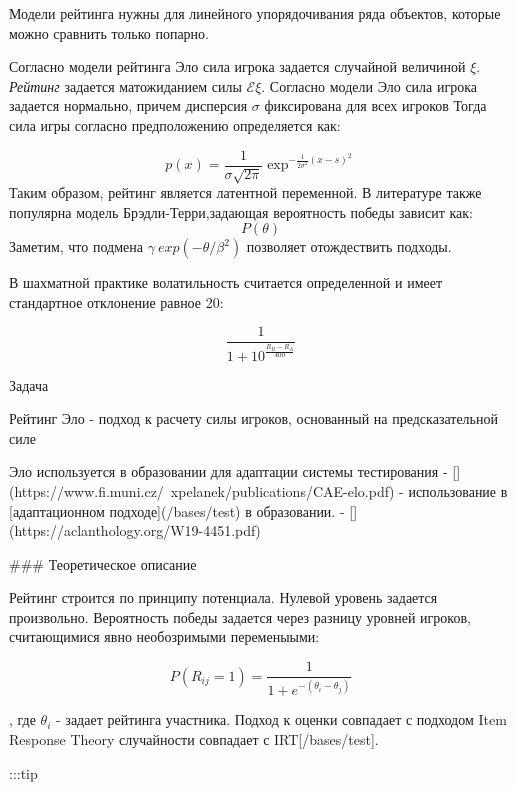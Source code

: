 Модели рейтинга нужны для линейного упорядочивания ряда объектов, которые можно сравнить только попарно.

Согласно модели рейтинга Эло сила игрока задается случайной величиной $\xi$. \textit{Рейтинг} задается матожиданием силы $\mathcal{E} \xi$.
Согласно модели Эло сила игрока задается нормально, причем дисперсия $\sigma$ фиксирована для всех игроков
Тогда сила игры согласно предположению определяется как:

\begin{equation}
    p(x) = \frac{1}{\sigma \sqrt{2\pi}} \exp^{- \frac{1}{2\sigma^2}{(x-s)^2}}
\end{equation}
Таким образом, рейтинг является латентной переменной. В литературе также популярна модель Брэдли-Терри,задающая
вероятность победы зависит как:
\begin{equation}
    P(\theta)
\end{equation}
Заметим, что подмена $\gamma ~ exp(-\theta/\beta^2)$ позволяет отождествить подходы.



В шахматной практике волатильность считается определенной и имеет стандартное отклонение равное 20:

$$
    \frac{1}{1+10^\frac{R_B-R_A}{400}}
$$

Задача

\textit{}

Рейтинг Эло - подход к расчету силы игроков, основанный на предсказательной силе

Эло используется в образовании для адаптации системы тестирования \cite{}
- [](https://www.fi.muni.cz/~xpelanek/publications/CAE-elo.pdf) - использование в [адаптационном подходе](/bases/test) в образовании. 
- [](https://aclanthology.org/W19-4451.pdf)


### Теоретическое описание

Рейтинг строится по принципу потенциала. Нулевой уровень задается произвольно. Вероятность победы задается через разницу уровней игроков, считающимися явно необозримыми переменыыми:

$$
    P(R_{ij}=1) = \frac{1}{1 + e^{-(\theta_i - \theta_j)}}
$$

, где $\theta_i$ - задает рейтинга участника. Подход к оценки совпадает с подходом Item Response Theory случайности совпадает с IRT[/bases/test]. 







:::tip

